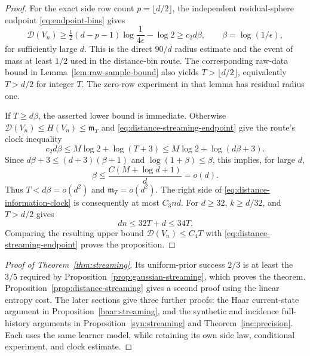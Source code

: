 \begin{proof}
For the exact side row count $p=\lfloor d/2\rfloor$, the independent
residual-sphere endpoint \eqref{eq:endpoint-bins} gives
\begin{equation}\label{eq:distance-streaming-endpoint}
 \mathcal D(V_n)\ge
 \tfrac12(d-p-1)\log\frac1{4\epsilon}-\log2
 \ge c_2d\beta,\qquad \beta=\log(1/\epsilon),
\end{equation}
for sufficiently large $d$. This is the direct $90/d$ radius estimate
and the event of mass at least $1/2$ used in the distance-bin route.
The corresponding raw-data bound in Lemma~\ref{lem:raw-sample-bound}
also yields $T>\lfloor d/2\rfloor$, equivalently $T>d/2$ for integer $T$.
The zero-row experiment in that lemma has residual radius one.

If $T\ge d\beta$, the asserted lower bound is immediate. Otherwise
$\mathcal D(V_n)\le H(V_n)\le\mathfrak m_T$ and
\eqref{eq:distance-streaming-endpoint} give the route's clock inequality
\[
 c_2d\beta\le M\log2+\log(T+3)
 \le M\log2+\log(d\beta+3).
\]
Since $d\beta+3\le(d+3)(\beta+1)$ and
$\log(1+\beta)\le\beta$, this implies, for large $d$,
\begin{equation}\label{eq:distance-short-clock}
 \beta\le \frac{C(M+\log d+1)}d=o(d).
\end{equation}
Thus $T<d\beta=o(d^2)$ and $\mathfrak m_T=o(d^2)$. The right side of
\eqref{eq:distance-information-clock} is consequently at most $C_3nd$.
For $d\ge32$, $k\ge d/32$, and $T>d/2$ gives
\[
 dn\le32T+d\le34T.
\]
Comparing the resulting upper bound $\mathcal D(V_n)\le C_4T$ with
\eqref{eq:distance-streaming-endpoint} proves the proposition.
\end{proof}

\begin{proof}[Proof of Theorem~\ref{thm:streaming}]
Its uniform-prior success $2/3$ is at least the $3/5$ required by
Proposition~\ref{prop:gaussian-streaming}, which proves the theorem.
Proposition~\ref{prop:distance-streaming} gives a second proof using
the linear entropy cost. The later sections give three further proofs:
the Haar current-state argument in Proposition~\ref{haar:streaming}, and
the synthetic and incidence full-history arguments in
Proposition~\ref{syn:streaming} and Theorem~\ref{inc:precision}.
Each uses the same learner model, while
retaining its own side law, conditional experiment, and clock estimate.
\end{proof}

